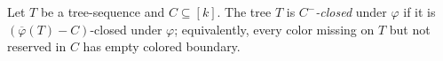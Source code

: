 \begin{definition}
Let $T$ be a tree-sequence and $C\subseteq[k]$.  The tree $T$ is
\emph{$C^{-}$-closed} under $\varphi$ if it is
$(\overline\varphi(T)-C)$-closed under $\varphi$; equivalently, every
color missing on $T$ but not reserved in $C$ has empty colored boundary.
\end{definition}

